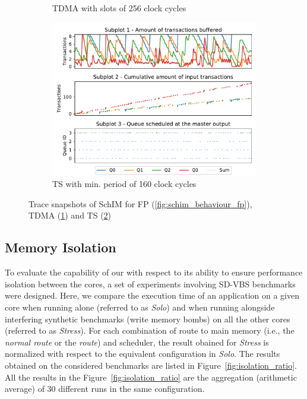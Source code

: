\begin{figure}[t]
\begin{subfigure}{0.45\textwidth}
        \caption{TDMA with slots of 256 clock cycles}
        \label{fig:schim_behaviour_tdma}
      \end{subfigure}
      \hfill
      \begin{subfigure}{0.45\textwidth}
        \centering
        \includegraphics[scale=0.45]{images/SchIM_TS_buffering.pdf}
        \caption{TS with min. period of 160 clock cycles}
        \label{fig:schim_behaviour_mg}
      \end{subfigure}
      \caption{Trace snapshots of SchIM for FP (\ref{fig:schim_behaviour_fp}), TDMA (\ref{fig:schim_behaviour_tdma}) and TS (\ref{fig:schim_behaviour_mg})}
      \label{fig:schim_behaviour}
    \end{figure}

\subsection{Memory Isolation}
\label{subsec:isolation}
To evaluate the capability of our \schim with respect to its ability to
ensure performance isolation between the cores, a set of experiments
involving SD-VBS benchmarks were designed. Here, we compare the
execution time of an application on a given core when running alone
(referred to as \emph{Solo}) and when running alongside interfering synthetic
benchmarks (write memory bombs) on all the other cores (referred to as
\emph{Stress}).
For each combination of route to main memory (i.e., the \emph{normal
route} or the \emph{\schim route}) and scheduler, the result obained
for \emph{Stress} is normalized with respect to the equivalent configuration
in \emph{Solo}.
The results obtained on the considered benchmarks are listed in
Figure~\ref{fig:isolation_ratio}. All the results in the
Figure~\ref{fig:isolation_ratio} are the aggregation (arithmetic average)
of 30 different runs in the same configuration.

